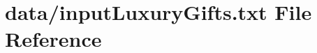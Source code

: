\hypertarget{inputLuxuryGifts_8txt}{}\section{data/input\+Luxury\+Gifts.txt File Reference}
\label{inputLuxuryGifts_8txt}
